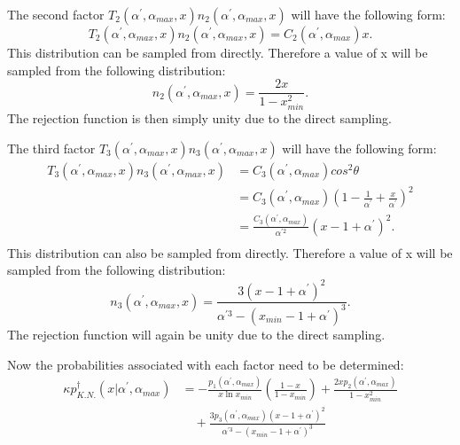 The second factor $T_2(\alpha^{'},\alpha_{max},x)n_2(\alpha^{'},\alpha_{max},x)$
will have the following form:
\begin{equation*}
  T_2(\alpha^{'},\alpha_{max},x)n_2(\alpha^{'},\alpha_{max},x) = 
  C_2(\alpha^{'},\alpha_{max})x.
\end{equation*}
This distribution can be sampled from directly. Therefore a value of x will
be sampled from the following distribution:
\begin{equation}
  n_2(\alpha^{'},\alpha_{max},x) = \frac{2x}{1-x_{min}^2}.
\end{equation}
The rejection function is then simply unity due to the direct sampling.

The third factor $T_3(\alpha^{'},\alpha_{max},x)n_3(\alpha^{'},\alpha_{max},x)$
will have the following form:
\begin{align}
  T_3(\alpha^{'},\alpha_{max},x)n_3(\alpha^{'},\alpha_{max},x) & = 
  C_3(\alpha^{'},\alpha_{max})cos^2\theta \nonumber \\
  & = C_3(\alpha^{'},\alpha_{max})
  \left(1 - \frac{1}{\alpha^{'}} + \frac{x}{\alpha^{'}}\right)^2 \nonumber \\
  & = \frac{C_3(\alpha^{'},\alpha_{max})}{\alpha^{'2}}\left(x-1+\alpha^{'}\right)^2.
  \nonumber \\
\end{align}
This distribution can also be sampled from directly. Therefore a value of x
will be sampled from the following distribution:
\begin{equation}
  n_3(\alpha^{'},\alpha_{max},x) = \frac{3\left(x-1+\alpha^{'}\right)^2}
  {\alpha^{'3} - \left(x_{min}-1+\alpha^{'}\right)^3}.
\end{equation}
The rejection function will again be unity due to the direct sampling.

Now the probabilities associated with each factor need to be determined:
\begin{align}
  \kappa p_{K.N.}^{\dagger}(x|\alpha^{'},\alpha_{max}) & = 
  -\frac{p_1(\alpha^{'},\alpha_{max})}{x\ln{x_{min}}}
  \left(\frac{1-x}{1-x_{min}}\right) +
  \frac{2xp_2(\alpha^{'},\alpha_{max})}{1-x_{min}^2} \nonumber \\
  & \quad +
  \frac{3p_3(\alpha^{'},\alpha_{max})\left(x-1+\alpha^{'}\right)^2}
  {\alpha^{'3} - \left(x_{min}-1+\alpha^{'}\right)^3} \nonumber
\end{align}

